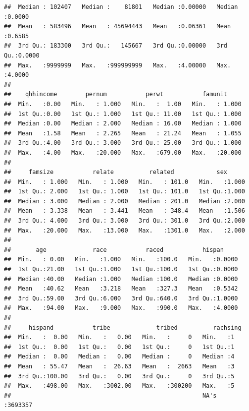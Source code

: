 \documentclass[
]{article}
\begin{document}
\begin{verbatim}
##  Median : 102407   Median :    81801   Median :0.00000   Median :0.0000  
##  Mean   : 583496   Mean   : 45694443   Mean   :0.06361   Mean   :0.6585  
##  3rd Qu.: 183300   3rd Qu.:   145667   3rd Qu.:0.00000   3rd Qu.:0.0000  
##  Max.   :9999999   Max.   :999999999   Max.   :4.00000   Max.   :4.0000  
##                                                                          
##    qhhincome        pernum           perwt           famunit      
##  Min.   :0.00   Min.   : 1.000   Min.   :  1.00   Min.   : 1.000  
##  1st Qu.:0.00   1st Qu.: 1.000   1st Qu.: 11.00   1st Qu.: 1.000  
##  Median :0.00   Median : 2.000   Median : 16.00   Median : 1.000  
##  Mean   :1.58   Mean   : 2.265   Mean   : 21.24   Mean   : 1.055  
##  3rd Qu.:4.00   3rd Qu.: 3.000   3rd Qu.: 25.00   3rd Qu.: 1.000  
##  Max.   :4.00   Max.   :20.000   Max.   :679.00   Max.   :20.000  
##                                                                   
##     famsize           relate          related            sex       
##  Min.   : 1.000   Min.   : 1.000   Min.   : 101.0   Min.   :1.000  
##  1st Qu.: 2.000   1st Qu.: 1.000   1st Qu.: 101.0   1st Qu.:1.000  
##  Median : 3.000   Median : 2.000   Median : 201.0   Median :2.000  
##  Mean   : 3.338   Mean   : 3.441   Mean   : 348.4   Mean   :1.506  
##  3rd Qu.: 4.000   3rd Qu.: 3.000   3rd Qu.: 301.0   3rd Qu.:2.000  
##  Max.   :20.000   Max.   :13.000   Max.   :1301.0   Max.   :2.000  
##                                                                    
##       age             race           raced           hispan      
##  Min.   : 0.00   Min.   :1.000   Min.   :100.0   Min.   :0.0000  
##  1st Qu.:21.00   1st Qu.:1.000   1st Qu.:100.0   1st Qu.:0.0000  
##  Median :40.00   Median :1.000   Median :100.0   Median :0.0000  
##  Mean   :40.62   Mean   :3.218   Mean   :327.3   Mean   :0.5342  
##  3rd Qu.:59.00   3rd Qu.:6.000   3rd Qu.:640.0   3rd Qu.:1.0000  
##  Max.   :94.00   Max.   :9.000   Max.   :990.0   Max.   :4.0000  
##                                                                  
##     hispand           tribe             tribed          rachsing      
##  Min.   :  0.00   Min.   :   0.00   Min.   :     0   Min.   :1        
##  1st Qu.:  0.00   1st Qu.:   0.00   1st Qu.:     0   1st Qu.:1        
##  Median :  0.00   Median :   0.00   Median :     0   Median :4        
##  Mean   : 55.47   Mean   :  26.63   Mean   :  2663   Mean   :3        
##  3rd Qu.:100.00   3rd Qu.:   0.00   3rd Qu.:     0   3rd Qu.:5        
##  Max.   :498.00   Max.   :3002.00   Max.   :300200   Max.   :5        
##                                                      NA's   :3693357  

\end{verbatim}
\end{document}
